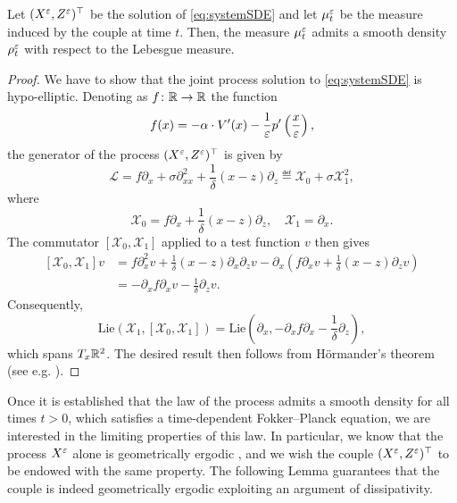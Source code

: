 \documentclass[10pt]{article}
\begin{document}
\begin{lemma}\label{lem:density} Let $(X^\varepsilon, Z^\varepsilon)^\top$ be the solution of \eqref{eq:systemSDE} and let $\mu^\varepsilon_t$ be the measure induced by the couple at time $t$. Then, the measure $\mu^\varepsilon_t$ admits a smooth density $\rho^\varepsilon_t$ with respect to the Lebesgue measure.
\end{lemma}

\begin{proof} We have to show that the joint process solution to \eqref{eq:systemSDE} is hypo-elliptic. Denoting as $f\colon \mathbb{R} \to \mathbb{R}$ the function 
	\begin{equation}
		f(x) = -\alpha \cdot V'(x) - \frac1{\varepsilon} p'\left(\frac{x}{\varepsilon}\right),
	\end{equation}
	the generator of the process $(X^\varepsilon, Z^\varepsilon)^\top$ is given by
	\begin{equation}
		\mathcal L = f \partial_x + \sigma \partial_{xx}^2 + \frac1\delta (x - z)\partial_z \eqdef \mathcal X_0 + \sigma \mathcal X_1^2, 
	\end{equation}
	where 
	\begin{equation}
		\mathcal X_0 = f \partial_x + \frac1\delta (x - z)\partial_z, \quad \mathcal X_1 = \partial_x.
	\end{equation}
	The commutator $[\mathcal X_0, \mathcal X_1]$ applied to a test function $v$ then gives
	\begin{equation}
	\begin{aligned}
		[\mathcal X_0, \mathcal X_1]v &= f \partial_x^2 v + \frac1\delta (x - z) \partial_x \partial_z v  - \partial_x\left(f\partial_x v + \frac1\delta (x - z)\partial_z v\right)\\
		&= -\partial_x f \partial_x v - \frac1\delta \partial_z v.
	\end{aligned}
	\end{equation}
	Consequently, 
	\begin{equation}
		\mathrm{Lie}\left(\mathcal X_1, [\mathcal X_0, \mathcal X_1]\right) = \mathrm{Lie} \left(\partial_x, -\partial_x f \partial_x - \frac1\delta\partial_z\right),
	\end{equation}
	which spans $T_x\mathbb{R}^2$. The desired result then follows from Hörmander's theorem (see e.g. \cite[Chapter 6]{Pav14}).
\end{proof}

Once it is established that the law of the process admits a smooth density for all times $t>0$, which satisfies a time-dependent Fokker--Planck equation, we are interested in the limiting properties of this law. In particular, we know that the process $X^\varepsilon$ alone is geometrically ergodic \cite[Theorem 4.4]{MSH02}, and we wish the couple $(X^\varepsilon, Z^\varepsilon)^\top$ to be endowed with the same property. The following Lemma guarantees that the couple is indeed geometrically ergodic exploiting an argument of dissipativity. 
\end{document}
